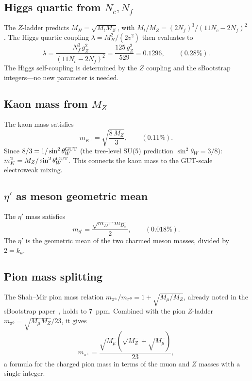\documentclass[11pt]{article}
\begin{document}
\subsection{Higgs quartic from $N_c,N_f$}

The $Z$-ladder predicts $M_H = \sqrt{M_t M_Z}$, with
$M_t/M_Z = (2N_f)^3/(11N_c-2N_f)^2$.  The Higgs quartic
coupling $\lambda = M_H^2/(2v^2)$ then evaluates to
\begin{equation}
  \lambda = \frac{N_f^3\,g_Z^2}{(11N_c-2N_f)^2}
  = \frac{125\,g_Z^2}{529} = 0.1296,
  \qquad (0.28\%).
\end{equation}
The Higgs self-coupling is determined by the $Z$ coupling
and the sBootstrap integers---no new parameter is needed.

\subsection{Kaon mass from $M_Z$}

The kaon mass satisfies
\begin{equation}
  m_{K^\pm} = \sqrt{\frac{8\,M_Z}{3}},
  \qquad (0.11\%).
\end{equation}
Since $8/3 = 1/\sin^2\theta_W^{\rm GUT}$ (the tree-level SU(5)
prediction $\sin^2\theta_W = 3/8$):
$m_K^2 = M_Z/\sin^2\theta_W^{\rm GUT}$.
This connects the kaon mass to the GUT-scale electroweak mixing.

\subsection{$\eta'$ as meson geometric mean}

The $\eta'$ mass satisfies
\begin{equation}
  m_{\eta'} = \frac{\sqrt{m_{D^0}\cdot m_{D_s}}}{2},
  \qquad (0.018\%).
\end{equation}
The $\eta'$ is the geometric mean of the two charmed meson masses,
divided by $2 = k_u$.

\subsection{Pion mass splitting}

The Shah--Mir pion mass relation
$m_{\pi^\pm}/m_{\pi^0} = 1 + \sqrt{M_\mu/M_Z}$,
already noted in the sBootstrap paper~\cite{gm_higgs},
holds to 7~ppm.  Combined with the pion $Z$-ladder
$m_{\pi^0} = \sqrt{M_\mu M_Z}/23$, it gives
\begin{equation}
  m_{\pi^\pm} = \frac{\sqrt{M_\mu}\!\left(\sqrt{M_Z}+\sqrt{M_\mu}\right)}{23},
\end{equation}
a formula for the charged pion mass in terms of the muon and $Z$ masses
with a single integer.
\end{document}
